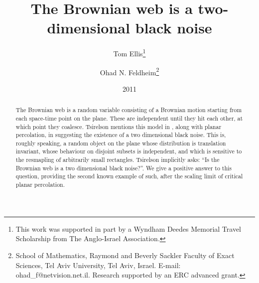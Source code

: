 \newcommand{\sigfield}{$\sigma$-field}
{
\title{The Brownian web is a two-dimensional black noise}

\newcommand{\tomthanks}{This work was supported in part by
a Wyndham Deedes Memorial Travel Scholarship from The Anglo-Israel
Association.}

\newcommand{\ohadthanks}{School of Mathematics, Raymond and Beverly Sackler Faculty of Exact
Sciences, Tel Aviv University, Tel Aviv, Israel. E-mail:
ohad\_f@netvision.net.il. Research supported by an ERC advanced grant.}

\author{Tom Ellis\thanks{\tomthanks}\\%
\and Ohad N. Feldheim\thanks{\ohadthanks}}

\date{2011}

\maketitle

\begin{abstract}
The Brownian web is a random variable consisting of a Brownian motion
starting from each space-time point on the plane.  These are
independent until they hit each other, at which point they coalesce.
Tsirelson mentions this model in
\cite{tsirelson-scaling-limit-noise-stability}, along with planar
percolation, in suggesting the existence of a two dimensional black
noise.  This is, roughly speaking, a random object on the plane whose
distribution is translation invariant, whose behaviour on disjoint
subsets is independent, and which is sensitive to the resmapling of
arbitrarily small rectangles.  Tsirelson implicitly asks: ``Is the
Brownian web is a two dimensional black noise?''.  We give a positive
answer to this question, providing the second known example of such,
after the scaling limit of critical planar percolation.
\end{abstract}

}

